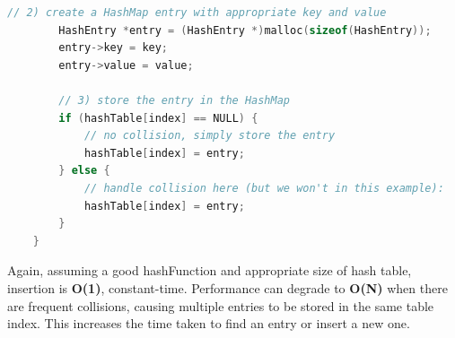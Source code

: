 \documentclass[12pt]{article}
\begin{document}
\begin{enumerate}
\begin{lstlisting}[language=C]
        // 2) create a HashMap entry with appropriate key and value
        HashEntry *entry = (HashEntry *)malloc(sizeof(HashEntry));
        entry->key = key;
        entry->value = value;
    
        // 3) store the entry in the HashMap
        if (hashTable[index] == NULL) {
            // no collision, simply store the entry
            hashTable[index] = entry;
        } else {
            // handle collision here (but we won't in this example):
            hashTable[index] = entry;
        }
    }    
    \end{lstlisting}
    Again, assuming a good hashFunction and appropriate size of hash table, insertion is \textbf{O(1)}, constant-time. Performance can degrade to \textbf{O(N)} when there are frequent collisions, causing multiple entries to be stored in the same table index. This increases the time taken to find an entry or insert a new one.
\end{enumerate}
\end{document}
